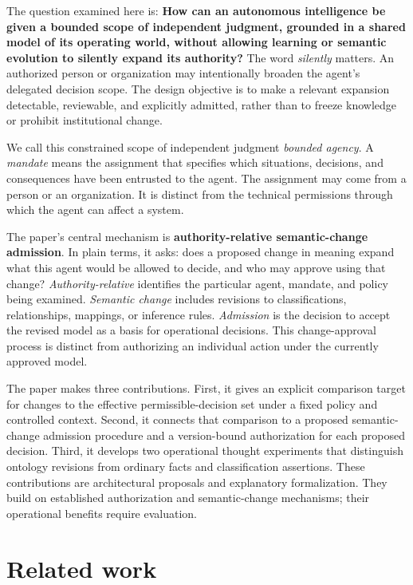\documentclass[
  english,
  12pt,
  a4paper,
  preprint,
  numbers,
  nopreprintline]{elsarticle}
\begin{document}
The question examined here is: \textbf{How can an autonomous
intelligence be given a bounded scope of independent judgment, grounded
in a shared model of its operating world, without allowing learning or
semantic evolution to silently expand its authority?} The word
\emph{silently} matters. An authorized person or organization may
intentionally broaden the agent's delegated decision scope. The design
objective is to make a relevant expansion detectable, reviewable, and
explicitly admitted, rather than to freeze knowledge or prohibit
institutional change.

We call this constrained scope of independent judgment \emph{bounded
agency}. A \emph{mandate} means the assignment that specifies which
situations, decisions, and consequences have been entrusted to the
agent. The assignment may come from a person or an organization. It is
distinct from the technical permissions through which the agent can
affect a system.

The paper's central mechanism is \textbf{authority-relative
semantic-change admission}. In plain terms, it asks: does a proposed
change in meaning expand what this agent would be allowed to decide, and
who may approve using that change? \emph{Authority-relative} identifies
the particular agent, mandate, and policy being examined. \emph{Semantic
change} includes revisions to classifications, relationships, mappings,
or inference rules. \emph{Admission} is the decision to accept the
revised model as a basis for operational decisions. This change-approval
process is distinct from authorizing an individual action under the
currently approved model.

The paper makes three contributions. First, it gives an explicit
comparison target for changes to the effective permissible-decision set
under a fixed policy and controlled context. Second, it connects that
comparison to a proposed semantic-change admission procedure and a
version-bound authorization for each proposed decision. Third, it
develops two operational thought experiments that distinguish ontology
revisions from ordinary facts and classification assertions. These
contributions are architectural proposals and explanatory formalization.
They build on established authorization and semantic-change mechanisms;
their operational benefits require evaluation.

\section{Related work}\label{related-work}
\end{document}
